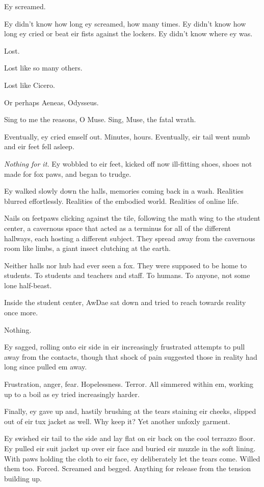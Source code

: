 Ey screamed.

Ey didn't know how long ey screamed, how many times. Ey didn't know how long ey cried or beat eir fists against the lockers. Ey didn't know where ey was.

Lost.

Lost like so many others.

Lost like Cicero.

Or perhaps Aeneas, Odysseus.

Sing to me the reasons, O Muse. Sing, Muse, the fatal wrath.

Eventually, ey cried emself out. Minutes, hours. Eventually, eir tail went numb and eir feet fell asleep.

\emph{Nothing for it.} Ey wobbled to eir feet, kicked off now ill-fitting shoes, shoes not made for fox paws, and began to trudge.

Ey walked slowly down the halls, memories coming back in a wash. Realities blurred effortlessly. Realities of the embodied world. Realities of online life.

Nails on feetpaws clicking against the tile, following the math wing to the student center, a cavernous space that acted as a terminus for all of the different hallways, each hosting a different subject. They spread away from the cavernous room like limbs, a giant insect clutching at the earth.

Neither halls nor hub had ever seen a fox. They were supposed to be home to students. To students and teachers and staff. To humans. To anyone, not some lone half-beast.

Inside the student center, AwDae sat down and tried to reach towards reality once more.

Nothing.

Ey sagged, rolling onto eir side in eir increasingly frustrated attempts to pull away from the contacts, though that shock of pain suggested those in reality had long since pulled em away.

Frustration, anger, fear. Hopelessness. Terror. All simmered within em, working up to a boil as ey tried increasingly harder.

Finally, ey gave up and, hastily brushing at the tears staining eir cheeks, slipped out of eir tux jacket as well. Why keep it? Yet another unfoxly garment.

Ey swished eir tail to the side and lay flat on eir back on the cool terrazzo floor. Ey pulled eir suit jacket up over eir face and buried eir muzzle in the soft lining. With paws holding the cloth to eir face, ey deliberately let the tears come. Willed them too. Forced. Screamed and begged. Anything for release from the tension building up.

